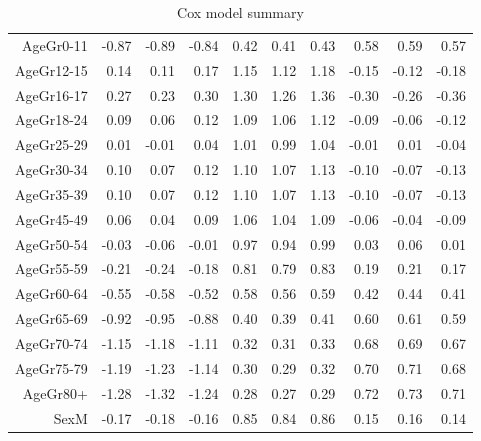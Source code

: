 \begin{table}[ht]
\begin{tabular}{rrrrrrrrrr}
  AgeGr0-11 & -0.87 & -0.89 & -0.84 & 0.42 & 0.41 & 0.43 & 0.58 & 0.59 & 0.57 \\ 
  AgeGr12-15 & 0.14 & 0.11 & 0.17 & 1.15 & 1.12 & 1.18 & -0.15 & -0.12 & -0.18 \\ 
  AgeGr16-17 & 0.27 & 0.23 & 0.30 & 1.30 & 1.26 & 1.36 & -0.30 & -0.26 & -0.36 \\ 
  AgeGr18-24 & 0.09 & 0.06 & 0.12 & 1.09 & 1.06 & 1.12 & -0.09 & -0.06 & -0.12 \\ 
  AgeGr25-29 & 0.01 & -0.01 & 0.04 & 1.01 & 0.99 & 1.04 & -0.01 & 0.01 & -0.04 \\ 
  AgeGr30-34 & 0.10 & 0.07 & 0.12 & 1.10 & 1.07 & 1.13 & -0.10 & -0.07 & -0.13 \\ 
  AgeGr35-39 & 0.10 & 0.07 & 0.12 & 1.10 & 1.07 & 1.13 & -0.10 & -0.07 & -0.13 \\ 
  AgeGr45-49 & 0.06 & 0.04 & 0.09 & 1.06 & 1.04 & 1.09 & -0.06 & -0.04 & -0.09 \\ 
  AgeGr50-54 & -0.03 & -0.06 & -0.01 & 0.97 & 0.94 & 0.99 & 0.03 & 0.06 & 0.01 \\ 
  AgeGr55-59 & -0.21 & -0.24 & -0.18 & 0.81 & 0.79 & 0.83 & 0.19 & 0.21 & 0.17 \\ 
  AgeGr60-64 & -0.55 & -0.58 & -0.52 & 0.58 & 0.56 & 0.59 & 0.42 & 0.44 & 0.41 \\ 
  AgeGr65-69 & -0.92 & -0.95 & -0.88 & 0.40 & 0.39 & 0.41 & 0.60 & 0.61 & 0.59 \\ 
  AgeGr70-74 & -1.15 & -1.18 & -1.11 & 0.32 & 0.31 & 0.33 & 0.68 & 0.69 & 0.67 \\ 
  AgeGr75-79 & -1.19 & -1.23 & -1.14 & 0.30 & 0.29 & 0.32 & 0.70 & 0.71 & 0.68 \\ 
  AgeGr80+ & -1.28 & -1.32 & -1.24 & 0.28 & 0.27 & 0.29 & 0.72 & 0.73 & 0.71 \\ 
  SexM & -0.17 & -0.18 & -0.16 & 0.85 & 0.84 & 0.86 & 0.15 & 0.16 & 0.14 \\ 
   \hline
\end{tabular}
\caption{Cox model summary} 
\end{table}
